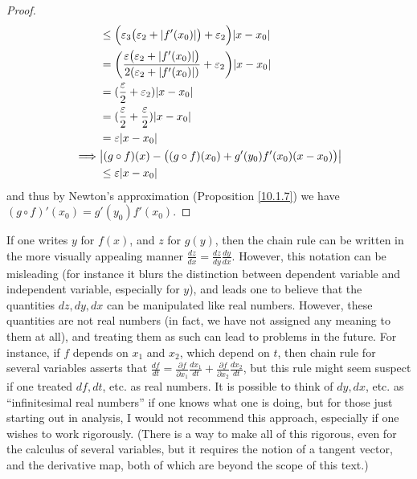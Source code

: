 \begin{proof}
\begin{align*}
                 & \leq \Big(\varepsilon_3 \big(\varepsilon_2 + \abs*{f'(x_0)}\big) + \varepsilon_2\Big) \abs*{x - x_0}                                        \\
                 & = \bigg(\frac{\varepsilon \big(\varepsilon_2 + \abs*{f'(x_0)}\big)}{2(\varepsilon_2 + \abs*{f'(x_0)})} + \varepsilon_2\bigg) \abs*{x - x_0} \\
                 & = (\frac{\varepsilon}{2} + \varepsilon_2) \abs*{x - x_0}                                                                                    \\
                 & = (\frac{\varepsilon}{2} + \frac{\varepsilon}{2}) \abs*{x - x_0}                                                                            \\
                 & = \varepsilon \abs*{x - x_0}                                                                                                                \\
        \implies & \abs*{(g \circ f)(x) - \big((g \circ f)(x_0) + g'(y_0) f'(x_0) (x - x_0)\big)}                                                              \\
                 & \leq \varepsilon \abs*{x - x_0}
    \end{align*}
    and thus by Newton's approximation (Proposition \ref{10.1.7}) we have \((g \circ f)'(x_0) = g'(y_0) f'(x_0)\).
\end{proof}

\setcounter{theorem}{16}
\begin{remark}\label{10.1.17}
    If one writes \(y\) for \(f(x)\), and \(z\) for \(g(y)\), then the chain rule can be written in the more visually appealing manner \(\frac{dz}{dx} = \frac{dz}{dy} \frac{dy}{dx}\).
    However, this notation can be misleading (for instance it blurs the distinction between dependent variable and independent variable, especially for \(y\)), and leads one to believe that the quantities \(dz, dy, dx\) can be manipulated like real numbers.
    However, these quantities are not real numbers (in fact, we have not assigned any meaning to them at all), and treating them as such can lead to problems in the future.
    For instance, if \(f\) depends on \(x_1\) and \(x_2\), which depend on \(t\), then chain rule for several variables asserts that \(\frac{df}{dt} = \frac{\partial f}{\partial x_1} \frac{dx_1}{dt} + \frac{\partial f}{\partial x_2} \frac{dx_2}{dt}\), but this rule might seem suspect if one treated \(df, dt\), etc. as real numbers.
    It is possible to think of \(dy, dx\), etc. as ``infinitesimal real numbers'' if one knows what one is doing, but for those just starting out in analysis, I would not recommend this approach, especially if one wishes to work rigorously.
    (There is a way to make all of this rigorous, even for the calculus of several variables, but it requires the notion of a tangent vector, and the derivative map, both of which are beyond the scope of this text.)
\end{remark}


